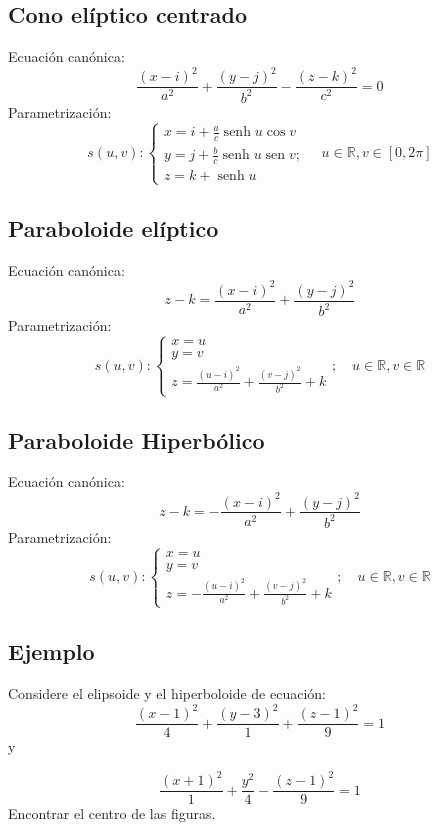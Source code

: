 \subsection{Cono elíptico centrado}
Ecuación canónica:
$$
    \frac{(x-i)^{2}}{a^{2}}+\frac{(y-j)^{2}}{b^{2}}-\frac{(z-k)^{2}}{c^{2}}=0
$$
Parametrización:
$$
    s(u, v):\left\{\begin{array}{l}
        x=i+\frac{a}{c} \operatorname{senh} u \cos v                 \\
        y=j+\frac{b}{c} \operatorname{senh} u \operatorname{sen} v ; \\
        z=k+\operatorname{senh} u
    \end{array} \quad u \in \mathbb{R}, v \in[0,2 \pi]\right.
$$

\subsection{Paraboloide elíptico}
Ecuación canónica:
$$
    z-k=\frac{(x-i)^{2}}{a^{2}}+\frac{(y-j)^{2}}{b^{2}}
$$
Parametrización:
$$
    s(u, v):\left\{\begin{array}{l}
        x=u \\
        y=v \\
        z=\frac{(u-i)^{2}}{a^{2}}+\frac{(v-j)^{2}}{b^{2}}+k
    \end{array} ; \quad u \in \mathbb{R}, v \in \mathbb{R}\right.
$$

\subsection{Paraboloide Hiperbólico}
Ecuación canónica:
$$
    z-k=-\frac{(x-i)^{2}}{a^{2}}+\frac{(y-j)^{2}}{b^{2}}
$$
Parametrización:
$$
    s(u, v):\left\{\begin{array}{l}
        x=u \\
        y=v \\
        z=-\frac{(u-i)^{2}}{a^{2}}+\frac{(v-j)^{2}}{b^{2}}+k
    \end{array} ; \quad u \in \mathbb{R}, v \in \mathbb{R}\right.
$$
\subsection{Ejemplo}

Considere el elipsoide y el hiperboloide de ecuación:
$$
    \frac{(x-1)^{2}}{4}+\frac{(y-3)^{2}}{1}+\frac{(z-1)^{2}}{9}=1
$$
y

$$
    \frac{(x+1)^{2}}{1}+\frac{y^{2}}{4}-\frac{(z-1)^{2}}{9}=1
$$
Encontrar el centro de las figuras.

